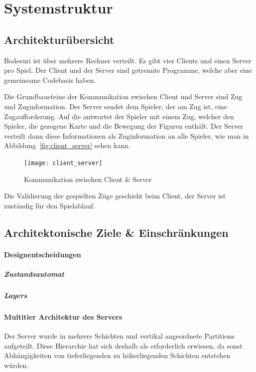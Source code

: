 \documentclass[12pt,halfparskip]{scrartcl}
\begin{document}


\section{Systemstruktur} %
\label{Systemstruktur}

\subsection{Architekturübersicht} %
\label{sub:architekturuebersicht}

Bodesuri ist über mehrere Rechner verteilt. Es gibt vier Clients und einen Server pro Spiel. Der Client und der Server sind getrennte Programme, welche aber eine gemeinsame Codebasis haben.

Die Grundbausteine der Kommunikation zwischen Client und Server sind Zug und Zuginformation. Der Server sendet dem Spieler, der am Zug ist, eine Zugaufforderung. Auf die antwortet der Spieler mit einem Zug, welcher den Spieler, die gezogene Karte und die Bewegung der Figuren enthält. Der Server verteilt dann diese Informationen als Zuginformation an alle Spieler, wie man in Abbildung~\vref{fig:client_server} sehen kann.

\begin{figure}[h]
	\centering
	\texttt{[image: client\_server]}
	\caption{Kommunikation zwischen Client \& Server}
	\label{fig:client_server}
\end{figure}

Die Validierung der gespielten Züge geschieht beim Client, der Server ist zuständig für den Spielablauf.

\subsection{Architektonische Ziele \& Einschränkungen} %
\label{sub:architektonische_ziele_einschraenkungen}
\paragraph{Designentscheidungen}\label{ssub:designentscheidungen} %
\subparagraph{Zustandsautomat} %
\label{ssub:zustandsautomat}
\subparagraph{Layers} %
\label{ssub:layers}


\paragraph{Multitier Architektur des Servers}\label{ssub:multitier_architektur_des_servers} %
Der Server wurde in mehrere Schichten und vertikal angeordnete Partitions aufgeteilt. Diese Hierarchie hat sich deshalb als erforderlich erwiesen, da sonst Abhängigkeiten von tieferliegenden zu höherliegenden Schichten entstehen würden.
\end{document}
